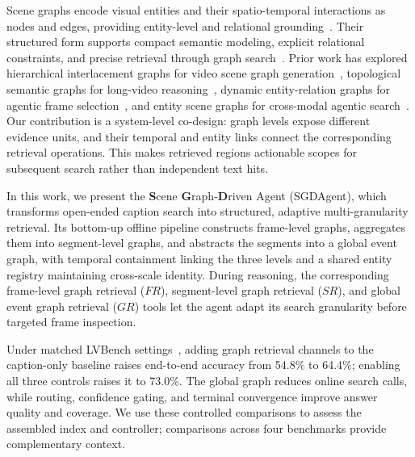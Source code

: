 \documentclass[11pt]{article}
\begin{document}

Scene graphs encode visual entities and their spatio-temporal interactions as nodes and edges, providing entity-level and relational grounding~\cite{scenegraph1,tpt2023}.
Their structured form supports compact semantic modeling, explicit relational constraints, and precise retrieval through graph search~\cite{scenegraph1,scenegraph2,qiu2025step}.
Prior work has explored hierarchical interlacement graphs for video scene graph generation~\cite{hig2024}, topological semantic graphs for long-video reasoning~\cite{videomindpalace2025}, dynamic entity-relation graphs for agentic frame selection~\cite{graphvideoagent2025}, and entity scene graphs for cross-modal agentic search~\cite{egagent2026}.
Our contribution is a system-level co-design: graph levels expose different evidence units, and their temporal and entity links connect the corresponding retrieval operations.
This makes retrieved regions actionable scopes for subsequent search rather than independent text hits.


In this work, we present the \textbf{S}cene \textbf{G}raph-\textbf{D}riven Agent (SGDAgent), which transforms open-ended caption search into structured, adaptive multi-granularity retrieval.
Its bottom-up offline pipeline constructs frame-level graphs, aggregates them into segment-level graphs, and abstracts the segments into a global event graph, with temporal containment linking the three levels and a shared entity registry maintaining cross-scale identity.
During reasoning, the corresponding frame-level graph retrieval ($FR$), segment-level graph retrieval ($SR$), and global event graph retrieval ($GR$) tools let the agent adapt its search granularity before targeted frame inspection.


Under matched LVBench settings~\cite{lvbench}, adding graph retrieval channels to the caption-only baseline raises end-to-end accuracy from 54.8\% to 64.4\%; enabling all three controls raises it to 73.0\%.
The global graph reduces online search calls, while routing, confidence gating, and terminal convergence improve answer quality and coverage.
We use these controlled comparisons to assess the assembled index and controller; comparisons across four benchmarks provide complementary context.

\end{document}
